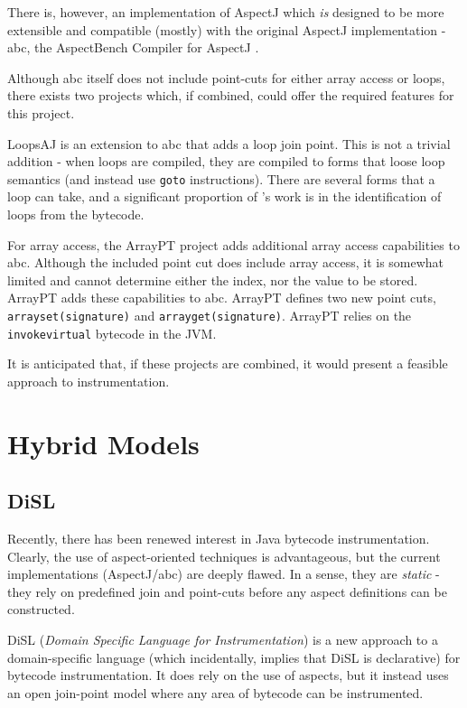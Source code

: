 		There is, however, an implementation of AspectJ which \emph{is} designed to be more extensible and compatible (mostly) with the original AspectJ implementation - abc, the AspectBench Compiler for AspectJ \citep{Allan2005}.
		
		Although abc itself does not include point-cuts for either array access or loops, there exists two projects which, if combined, could offer the required features for this project.
		
		LoopsAJ \citep{Harbulot2005} is an extension to abc that adds a loop join point. This is not a trivial addition - when loops are compiled, they are compiled to forms that loose loop semantics (and instead use \texttt{goto} instructions). There are several forms that a loop can take, and a significant proportion of \citeauthor{Harbulot2005}'s work is in the identification of loops from the bytecode.
				
		For array access, the ArrayPT project \citep{Chen2007} adds additional array access capabilities to abc. Although the included point cut does include array access, it is somewhat limited and cannot determine either the index, nor the value to be stored. ArrayPT adds these capabilities to abc. ArrayPT defines two new point cuts, \texttt{arrayset(signature)} and \texttt{arrayget(signature)}. ArrayPT relies on the \texttt{invokevirtual} bytecode in the JVM.
		
		It is anticipated that, if these projects are combined, it would present a feasible approach to instrumentation.

\section{Hybrid Models} \label{sec:instrumentation/hybrid}
	\subsection{DiSL} \label{sec:instrumentation/hybrid/disl}
	Recently, there has been renewed interest in Java bytecode instrumentation. Clearly, the use of aspect-oriented techniques is advantageous, but the current implementations (AspectJ/abc) are deeply flawed. In a sense, they are \textit{static} - they rely on predefined join and point-cuts before any aspect definitions can be constructed.
	
	DiSL (\textit{Domain Specific Language for Instrumentation}) \citep{Marek2012} is a new approach to a domain-specific language (which incidentally, implies that DiSL is declarative) for bytecode instrumentation. It does rely on the use of aspects, but it instead uses an open join-point model where any area of bytecode can be instrumented.
	
